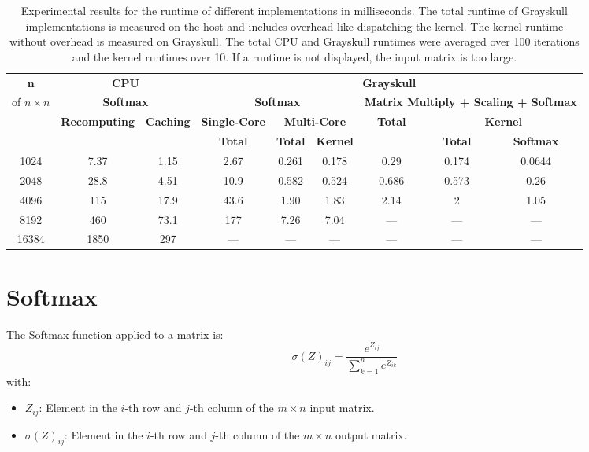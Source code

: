 \documentclass[conference]{IEEEtran}
\begin{document}
\begin{table*}[t]
\centering
\small
\begin{tabular}{|c|c|c|c|c|c|c|c|c|}
\hline
\textbf{n} & \multicolumn{2}{c|}{\textbf{CPU}} & \multicolumn{6}{c|}{\textbf{Grayskull}} \\
\cline{2-9}
of \(n \times n\) & \multicolumn{2}{c|}{\textbf{Softmax}} & \multicolumn{3}{c|}{\textbf{Softmax}} & \multicolumn{3}{c|}{\textbf{Matrix Multiply + Scaling + Softmax}} \\
\cline{2-9}
& \textbf{Recomputing} & \textbf{Caching} & \textbf{Single-Core} & \multicolumn{2}{c|}{\textbf{Multi-Core}} & \textbf{Total} & \multicolumn{2}{c|}{\textbf{Kernel}} \\
\cline{4-6} \cline{8-9}
& & &{\textbf{Total}} & \textbf{Total} & \textbf{Kernel} & & \textbf{Total} & \textbf{Softmax} \\
\hline
1024 & 7.37 & 1.15 & 2.67 & 0.261 & 0.178 & 0.29 & 0.174 & 0.0644 \\
\hline
2048 & 28.8 & 4.51 & 10.9 & 0.582 & 0.524 & 0.686 & 0.573 & 0.26 \\
\hline
4096 & 115 & 17.9 & 43.6 & 1.90 & 1.83 & 2.14 & 2 & 1.05 \\
\hline
8192 & 460 & 73.1 & 177 & 7.26 & 7.04 & {---} & {---} & {---} \\
\hline
16384 & 1850 & 297 & {---} & {---} & {---} & {---} & {---} & {---} \\
\hline
\end{tabular}
\caption{Experimental results for the runtime of different implementations in milliseconds. The total runtime of Grayskull implementations is measured on the host and includes overhead like dispatching the kernel. The kernel runtime without overhead is measured on Grayskull. The total CPU and Grayskull runtimes were averaged over 100 iterations and the kernel runtimes over 10. If a runtime is not displayed, the input matrix is too large.}
\label{tab:implementation_runtimes}
\end{table*}

\section{Softmax}
\label{sec:softmax}
The Softmax function applied to a matrix is:
\[
\sigma(Z)_{ij} = \frac{e^{Z_{ij}}}{\sum_{k=1}^n e^{Z_{ik}}}
\]
with:
\begin{itemize}
  \item \(Z_{ij}\): Element in the \(i\)-th row and \(j\)-th column of the \(m \times n\) input matrix.
  \item \(\sigma(Z)_{ij}\): Element in the \(i\)-th row and \(j\)-th column of the \(m \times n\) output matrix.
\end{itemize}
\end{document}
